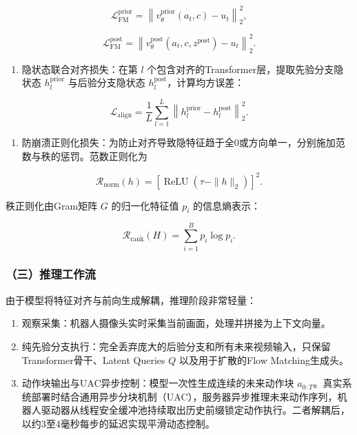 \[
\mathcal{L}_{\mathrm{FM}}^{\mathrm{prior}}=\left\|v_\theta^{\mathrm{prior}}(a_t,c)-u_t\right\|_2^2,
\]

\[
\mathcal{L}_{\mathrm{FM}}^{\mathrm{post}}=\left\|v_\theta^{\mathrm{post}}(a_t,c,z^{\mathrm{post}})-u_t\right\|_2^2.
\]

\begin{enumerate}
\def\labelenumi{\arabic{enumi}.}
\setcounter{enumi}{1}
\tightlist
\item
{}
  隐状态联合对齐损失：在第 \(l\) 个包含对齐的Transformer层，提取先验分支隐状态 \(h_l^{\mathrm{prior}}\) 与后验分支隐状态 \(h_l^{\mathrm{post}}\)，计算均方误差：
\end{enumerate}

\[
\mathcal{L}_{\mathrm{align}}=\frac{1}{L}\sum_{l=1}^{L}\left\|h_l^{\mathrm{prior}}-h_l^{\mathrm{post}}\right\|_2^2.
\]

\begin{enumerate}
\def\labelenumi{\arabic{enumi}.}
\setcounter{enumi}{2}
\tightlist
\item
  防崩溃正则化损失：为防止对齐导致隐特征趋于全0或方向单一，分别施加范数与秩的惩罚。范数正则化为
\end{enumerate}

\[
\mathcal{R}_{\mathrm{norm}}(h)=\left[\operatorname{ReLU}\!\left(\tau-\|h\|_2\right)\right]^2.
\]

秩正则化由Gram矩阵 \(G\) 的归一化特征值 \(p_i\) 的信息熵表示：

\[
\mathcal{R}_{\mathrm{rank}}(H)=\sum_{i=1}^{B}p_i\log p_i.
\]

\hypertarget{ux4e09ux63a8ux7406ux5de5ux4f5cux6d41}{%
\subsubsection{（三）推理工作流}\label{ux4e09ux63a8ux7406ux5de5ux4f5cux6d41}}

由于模型将特征对齐与前向生成解耦，推理阶段非常轻量：

\begin{enumerate}
\def\labelenumi{\arabic{enumi}.}
\tightlist
\item
  观察采集：机器人摄像头实时采集当前画面，处理并拼接为上下文向量。
\item
  纯先验分支执行：完全丢弃庞大的后验分支和所有未来视频输入，只保留Transformer骨干、Latent Queries \(Q\) 以及用于扩散的Flow Matching生成头。
\item
  动作块输出与UAC异步控制：模型一次性生成连续的未来动作块 \(a_{0:T}\)。真实系统部署时结合通用异步分块机制（UAC），服务器异步推理未来动作序列，机器人驱动器从线程安全缓冲池持续取出历史前缀锁定动作执行。二者解耦后，以约3至4毫秒每步的延迟实现平滑动态控制。
\end{enumerate}

